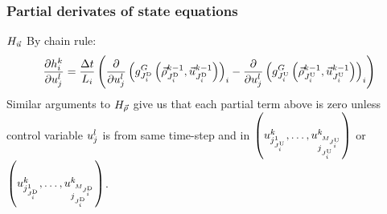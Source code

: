 \begin{frame}[t]\frametitle{Partial derivates of state equations}

\begin{block}{$H_{\vec{u}}$}
By chain rule:
\begin{equation}
\frac{\partial h_{i}^{k}}{\partial u_{j}^{l}}=\frac{\Delta t}{L_{i}}\left(\frac{\partial}{\partial u_{j}^{l}}\left(g^{G}_{J_{i}^{\text{D}}}\left(\vec{\rho}_{J_{i}^{\text{D}}}^{k-1},\vec{u}_{J_{i}^{\text{D}}}^{k-1}\right)\right)_{i}-\frac{\partial}{\partial u_{j}^{l}}\left(g^{G}_{J_{i}^{\text{U}}}\left(\vec{\rho}_{J_{i}^{\text{U}}}^{k-1},\vec{u}_{J_{i}^{\text{U}}}^{k-1}\right)\right)_{i}\right)\label{eqdhdvgod}
\end{equation}
Similar arguments to $H_{\vec{\rho}}$ give us that each partial term above is zero unless control variable $u_{j}^{l}$ is from same time-step and in $\left(u_{j_{J_{i}^{\text{U}}}^{1}}^{k},\ldots,u_{j_{J_{i}^{\text{U}}}^{M_{J_{i}^{\text{U}}}}}^{k}\right)$ or $\left(u_{j_{J_{i}^{\text{D}}}^{1}}^{k},\ldots,u_{j_{J_{i}^{\text{D}}}^{M_{J_{i}^{\text{D}}}}}^{k}\right)$.
\end{block}
\end{frame}





